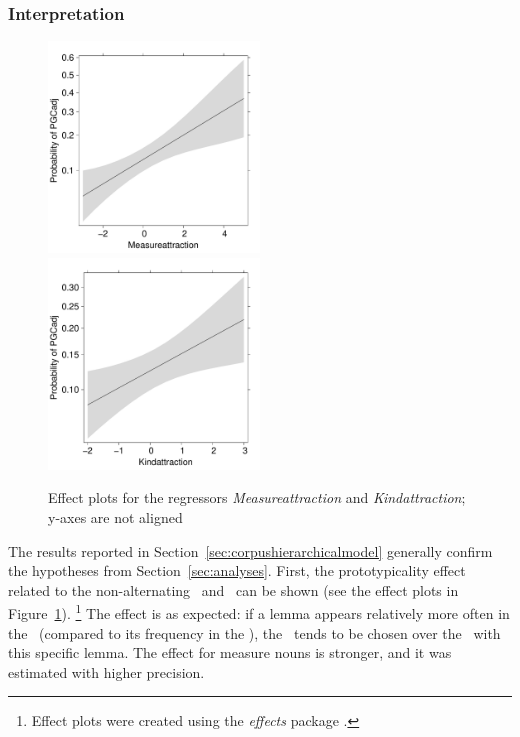 \subsubsection{Interpretation}
\label{sec:mainstudyinterpretation}

\begin{figure}[h!]
  \centering
  \includegraphics[width=0.5\textwidth]{../R/output/corpus_Measureattraction}~\includegraphics[width=0.5\textwidth]{../R/output/corpus_Kindattraction}
  \caption{Effect plots for the regressors \textit{Measureattraction} and \textit{Kindattraction}; y-axes are not aligned}
  \label{fig:eff:attraction}
\end{figure}

The results reported in Section~\ref{sec:corpushierarchicalmodel} generally confirm the hypotheses from Section~\ref{sec:analyses}.
First, the prototypicality effect related to the non-alternating \PGCd\ and \NACb\ can be shown (see the effect plots in Figure~\ref{fig:eff:attraction}).%
\footnote{Effect plots were created using the \textit{effects} package \citep{Fox2003}.}
The effect is as expected:
if a lemma appears relatively more often in the \PGCd\ (compared to its frequency in the \NACb), the \PGCa\ tends to be chosen over the \NACa\ with this specific lemma.
The effect for measure nouns is stronger, and it was estimated with higher precision.

